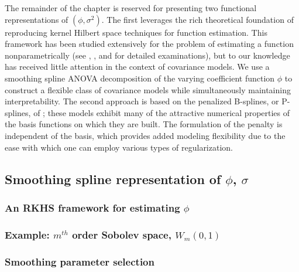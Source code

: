 \documentclass[12pt]{article}
\theoremstyle{definition}
\begin{document}
The remainder of the chapter is reserved for presenting two functional representations of $\left(\phi, \sigma^2\right)$. The first leverages the rich theoretical foundation of reproducing kernel Hilbert space techniques for function estimation. This framework has been studied extensively for the problem of estimating a function nonparametrically (see \citet{aronszajn1950theory}, \citet{wahba1990spline}, and \citet{berlinet2011reproducing} for detailed examinations), but to our knowledge has received little attention in the context of covariance models. We use a smoothing spline ANOVA decomposition of the varying coefficient function $\phi$ to construct a flexible class of covariance models while simultaneously maintaining interpretability. The second approach is based on the penalized B-splines, or P-splines, of \citet{eilers1996flexible}; these models exhibit many of the attractive numerical properties of the basis functions on which they are built. The formulation of the penalty is independent of the basis, which provides added modeling flexibility due to the ease with which one can employ various types of regularization.



\subsection{Smoothing spline representation of $\phi$, $\sigma$}


\subsubsection{An RKHS framework for estimating $\phi$}



\subsubsection{Example: $m^{th}$ order Sobolev space, $W_m\left(0,1\right)$}



\subsubsection{Smoothing parameter selection}

\end{document}
